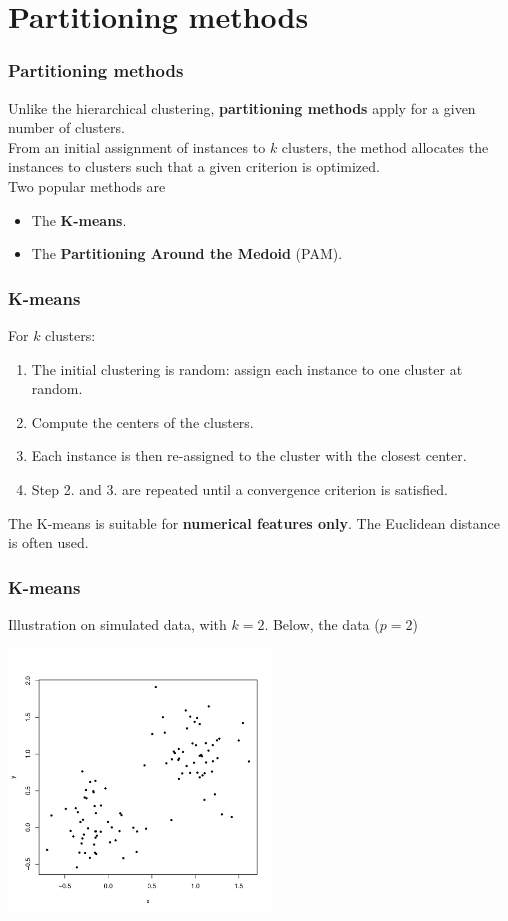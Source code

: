 \section{Partitioning methods}
\begin{frame}
\frametitle{Partitioning methods}
Unlike the hierarchical clustering, {\bf partitioning methods} apply for a given number of clusters. \\
\vspace{0.3cm}
From an initial assignment of instances to $k$ clusters, the method allocates the instances to clusters such that a given criterion is optimized. \\
\vspace{0.3cm}
Two popular methods are 
\begin{itemize}
\item The {\bf K-means}.
\item The {\bf Partitioning Around the Medoid} (PAM). 
\end{itemize}
\end{frame}
\begin{frame}
\frametitle{K-means}
For $k$ clusters:
\begin{enumerate}
\item The initial clustering is random: assign each instance to one cluster at random.
\item Compute the centers of the clusters. 
\item Each instance is then re-assigned to the cluster with the closest center.
\item Step 2. and 3. are repeated until a convergence criterion is satisfied.
\end{enumerate}
The K-means is suitable for {\bf numerical features only}. The Euclidean distance is often used.
\end{frame}
\begin{frame}
\frametitle{K-means}
Illustration on simulated data, with $k=2$. Below, the data ($p=2$)
\begin{center}
\includegraphics[width=7cm]{../../Graphs/kmeans1.pdf}
\end{center}
\end{frame}
